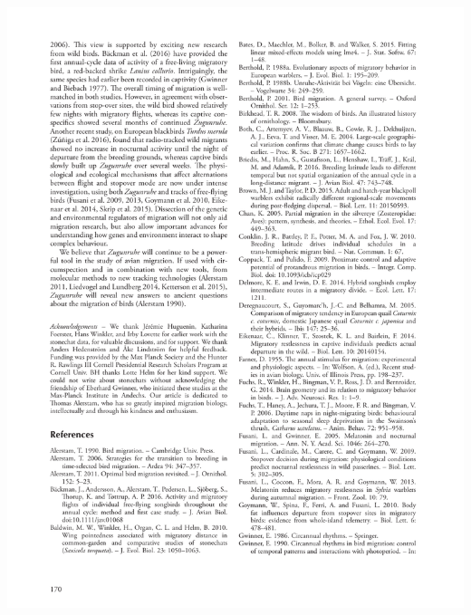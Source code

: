 \documentclass[a4paper, twoside]{templates/ociamthesis}
\begin{document}
\begin{center}\includegraphics[width=1\linewidth]{pdf_chapters/zug/zug_crop_Part16} \end{center}
\end{document}
